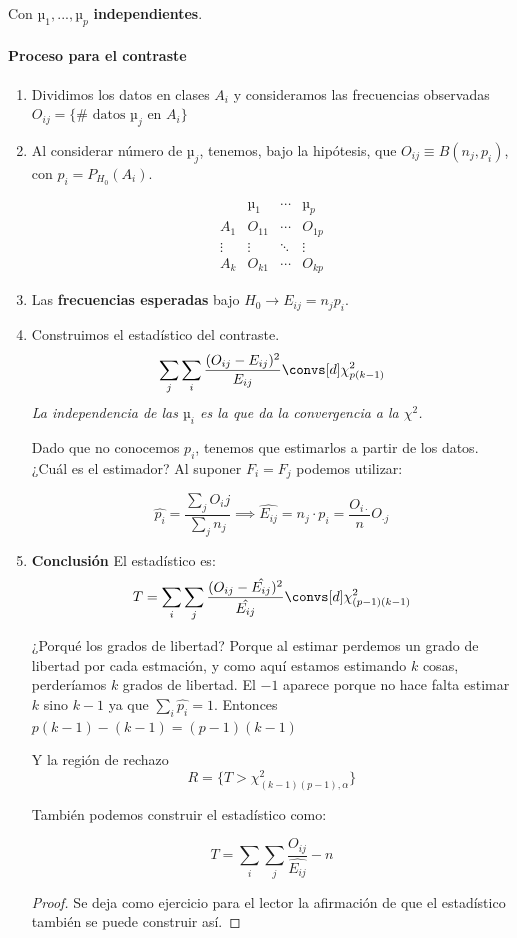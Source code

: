 Con $µ_1,...,µ_p$ \textbf{independientes}.

\paragraph{Proceso para el contraste}
\begin{enumerate}

\label{contraste::homogeneidad::chicuadrado}

\item Dividimos los datos en clases $A_i$ y consideramos las frecuencias observadas $O_{ij} = \{\#\text{ datos } µ_j \text{ en } A_i \}$

\item Al considerar número de $µ_j$, tenemos, bajo la hipótesis, que $O_{ij} \equiv B(n_j,p_i)$, con $p_i = P_{H_0}(A_i)$.

\begin{defn}
\[
\begin{array}{c|ccc}
&µ_1&\cdots & µ_p \\\hline
A_1 & O_{11} & \cdots & O_{1p}\\
\vdots & \vdots & \ddots & \vdots \\
A_k & O_{k1} & \cdots & O_{kp} 
\end{array}
\]
\end{defn}

\item Las \textbf{frecuencias esperadas} bajo $H_0 \to E_{ij} = n_jp_i$.

\item Construimos el estadístico del contraste. \[\sum_j \sum_i \frac{(O_{ij} - E_{ij})^2}{E_{ij}} \convs[d] \chi^2_{p(k-1)}\]
\subitem \textit{La independencia de las $µ_i$ es la que da la convergencia a la $\chi^2$.}

\subitem Dado que no conocemos $p_i$, tenemos que estimarlos a partir de los datos. ¿Cuál es el estimador? Al suponer $F_i = F_j$ podemos utilizar:

\[ \hat{p_i} = \frac{\sum_j O_ij}{\sum_j n_j} \implies \hat{E_{ij}} = n_j·p_i = \frac{O_{i·}}{n}O_{·j}\]

\item \textbf{Conclusión} El estadístico es: \[T = \sum_i \sum_j \frac{(O_{ij} - \hat{E_{ij}})^2}{\hat{E_{ij}}} \convs[d] \chi^2_{(p-1)(k-1)} \] 

\subitem ¿Porqué los grados de libertad? Porque al estimar perdemos un grado de libertad por cada estmación, y como aquí estamos estimando $k$ cosas, perderíamos $k$ grados de libertad. El $-1$ aparece porque no hace falta estimar $k$ sino $k-1$ ya que $\sum_i \hat{p_i} = 1$. Entonces $p(k-1) - (k-1) = (p-1)(k-1)$

Y la región de rechazo \[R = \{T>\chi^2_{(k-1)(p-1),α}\}\]

\obs También podemos construir el estadístico como:

\[
T = \sum_{i}\sum_j \frac{O_{ij}}{\hat{E_{ij}}} - n
\]

\begin{proof}
Se deja como ejercicio para el lector la afirmación de que el estadístico también se puede construir así.
\end{proof}
\end{enumerate}


